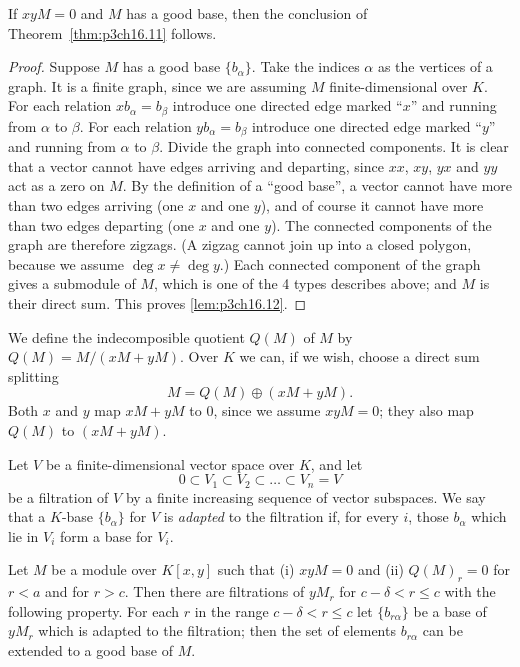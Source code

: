 \documentclass[../main]{subfiles}
\begin{document}
\begin{lemma}
\label{lem:p3ch16.12}
If $x y M = 0$ and $M$ has a good base, then the conclusion of Theorem~\ref{thm:p3ch16.11} follows. 
\end{lemma}

\begin{proof}
Suppose $M$ has a good base $\{b_\alpha\}$. Take the indices $\alpha$ as the vertices of a graph. It is a finite graph, since we are assuming $M$ finite-dimensional over $K$. For each relation $x b_\alpha = b_\beta$ introduce one directed edge marked ``$x$'' and running from $\alpha$ to $\beta$. For each relation $y b_\alpha = b_\beta$ introduce one directed edge marked ``$y$'' and running from $\alpha$ to $\beta$. Divide the graph into connected components. It is clear that a vector cannot have edges arriving and departing, since $x x$, $x y$, $y x$ and $y y$ act as a zero on $M$. By the definition of a ``good base'', a vector cannot have more than two edges arriving (one $x$ and one $y$), and of course it cannot have more than two edges departing (one $x$ and one $y$). The connected components of the graph are therefore zigzags. (A zigzag cannot join up into a closed polygon, because we assume $\deg x \ne \deg y$.) Each connected component of the graph gives a submodule of $M$, which is one of the 4 types describes above; and $M$ is their direct sum. This proves \ref{lem:p3ch16.12}.
\end{proof}

We define the indecomposible quotient $Q(M)$ of $M$ by $Q(M) = M/(x M +y M)$. Over $K$ we can, if we wish, choose a direct sum splitting \[M = Q(M) \oplus (x M + y M).\] Both $x$ and $y$ map $x M + y M$ to $0$, since we assume $x y M = 0$; they also map $Q(M)$ to $(x M + y M)$.

Let $V$ be a finite-dimensional vector space over $K$, and let \[0 \subset V_1 \subset V_2 \subset \ldots \subset V_n = V\] be a filtration of $V$ by a finite increasing sequence of vector subspaces. We say that a $K$-base $\{b_\alpha\}$ for $V$ is \emph{adapted} to the filtration if, for every $i$, those $b_\alpha$ which lie in $V_i$ form a base for $V_i$.

\begin{lemma}
\label{lem:p3ch16.13}
Let $M$ be a module over $K[x, y]$ such that (i) $xy M = 0$ and (ii) $Q(M)_r = 0$ for $r < a$ and for $r > c$. Then there are filtrations of $y M_r$ for $c - \delta < r \le c$ with the following property. For each $r$ in the range $c - \delta < r \le c$ let $\{b_{r \alpha}\}$ be a base of $y M_r$ which is adapted to the filtration; then the set of elements $b_{r \alpha}$ can be extended to a good base of $M$. 
\end{lemma}
\end{document}
